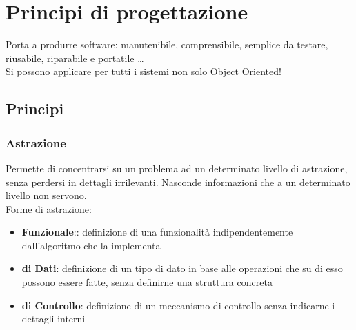 \documentclass[12pt, a4paper]{report}
\begin{document}
\section{Principi di progettazione}
Porta a produrre software: manutenibile, comprensibile, semplice da testare, riusabile, riparabile e portatile \ldots\\
Si possono applicare per tutti i sistemi non solo Object Oriented!
\subsection{Principi}
\subsubsection{Astrazione}
Permette di concentrarsi su un problema ad un determinato livello di astrazione, senza perdersi in dettagli irrilevanti. Nasconde informazioni che a un determinato livello non servono.\\
Forme di astrazione:
\begin{itemize}
    \item \textbf{Funzionale}:: definizione di una funzionalità indipendentemente dall'algoritmo che la implementa
    \item \textbf{di Dati}: definizione di un tipo di dato in base alle operazioni che su di esso possono essere fatte, senza definirne una struttura concreta
    \item \textbf{di Controllo}: definizione di un meccanismo di controllo senza indicarne i dettagli interni
\end{itemize}
\end{document}
